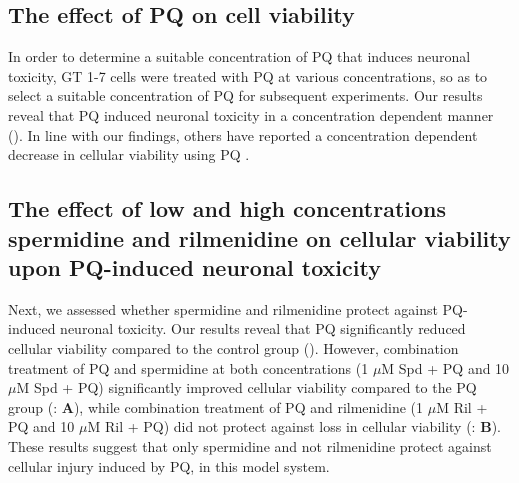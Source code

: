 \subsection{ The effect of PQ on cell viability}
In order to determine a suitable concentration of PQ that induces neuronal toxicity, GT 1-7 cells were treated with PQ at various concentrations, so as to select a suitable concentration of PQ for subsequent experiments. Our results reveal that PQ induced neuronal toxicity in a concentration dependent manner (). In line with our findings, others have reported a concentration dependent decrease in cellular viability using PQ \citep{Chen2012b,Jaroonwitchawan2017,Mehdi2013}. 

\subsection{The effect of low and high concentrations spermidine and rilmenidine on cellular viability upon PQ-induced neuronal toxicity} 
Next, we assessed whether spermidine and rilmenidine protect against PQ-induced neuronal toxicity. Our results reveal that PQ significantly reduced cellular viability compared to the control group (). However, combination treatment of PQ and spermidine at both concentrations (1 $\mu$M Spd + PQ and 10 $\mu$M Spd + PQ) significantly improved cellular viability compared to the PQ group (: \textbf{A}), while combination treatment of PQ and rilmenidine (1 $\mu$M Ril + PQ and 10 $\mu$M Ril + PQ) did not protect against loss in cellular viability (: \textbf{B}). These results suggest that only spermidine and not rilmenidine protect against cellular injury induced by PQ, in this model system.

